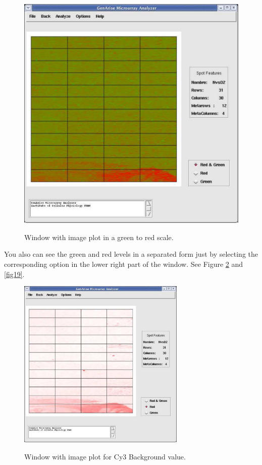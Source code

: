 \documentclass[12pt]{article}
\begin{document}
\begin{figure}[h]
\begin{center}
\includegraphics[scale= 0.3]{./images/principal.pdf}\\
\caption{Window with image plot in a green to red scale. \label{fig17}}
\end{center}
\end{figure}
You also can see the green and red levels in a separated form just by selecting the corresponding option in the lower right part of the window. See Figure \ref{fig18} and \ref{fig19}.
\begin{figure}[h]
\begin{center}
\includegraphics[height=3.in,width=3.15in]{./images/principalRed.pdf}\\
\caption{Window with image plot for Cy3 Background value. \label{fig18}}
\end{center}
\end{figure}
\end{document}
